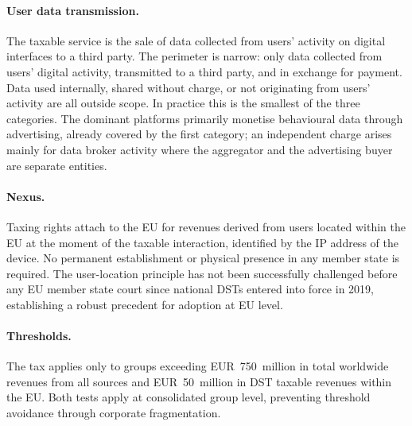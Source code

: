 \documentclass[../../main]{subfiles}
\begin{document}
\paragraph{User data transmission.}
The taxable service is the sale of data collected from users' activity on digital interfaces to a third party.
The perimeter is narrow: only data collected from users' digital activity, transmitted to a third party, and in exchange for payment.
Data used internally, shared without charge, or not originating from users' activity are all outside scope.
In practice this is the smallest of the three categories.
The dominant platforms primarily monetise behavioural data through advertising, already covered by the first category; an independent charge arises mainly for data broker activity where the aggregator and the advertising buyer are separate entities.


\paragraph{Nexus.}
Taxing rights attach to the EU for revenues derived from users located within the EU at the moment of the taxable interaction, identified by the IP address of the device.
No permanent establishment or physical presence in any member state is required.
The user-location principle has not been successfully challenged before any EU member state court since national DSTs entered into force in 2019, establishing a robust precedent for adoption at EU level.

\paragraph{Thresholds.}
The tax applies only to groups exceeding EUR~750~million in total worldwide revenues from all sources and EUR~50~million in DST taxable revenues within the EU.
Both tests apply at consolidated group level, preventing threshold avoidance through corporate fragmentation.
\end{document}

